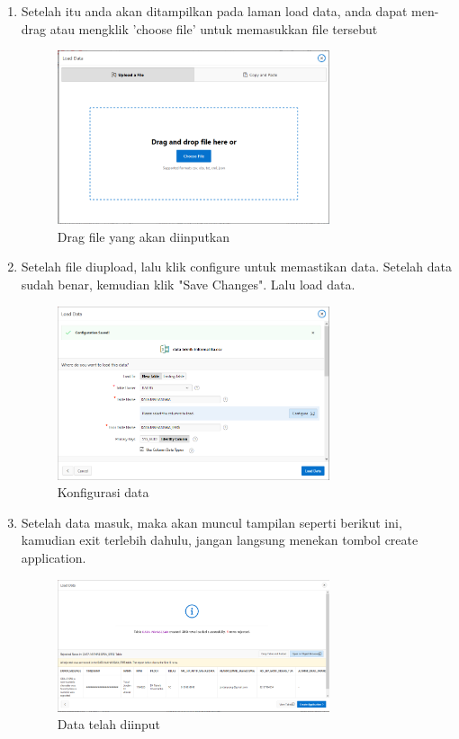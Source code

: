 \begin{enumerate}
	\item Setelah itu anda akan ditampilkan pada laman load data, anda dapat men-drag atau mengklik 'choose file' untuk memasukkan file tersebut
				\begin{figure}[H]
				\includegraphics[width=8cm]{figures/6.png}
				\centering
				\caption{Drag file yang akan diinputkan}
				\end{figure}
	\item Setelah file diupload, lalu klik configure untuk memastikan data. Setelah data sudah benar, kemudian klik "Save Changes". Lalu load data.
				\begin{figure}[H]
				\includegraphics[width=8cm]{figures/8.png}
				\centering
				\caption{Konfigurasi data}
				\end{figure}
	\item Setelah data masuk, maka akan muncul tampilan seperti berikut ini, kamudian exit terlebih dahulu, jangan langsung menekan tombol create application.
				\begin{figure}[H]
				\includegraphics[width=8cm]{figures/9.png}
				\centering
				\caption{Data telah diinput}

\end{figure}
\end{enumerate}
